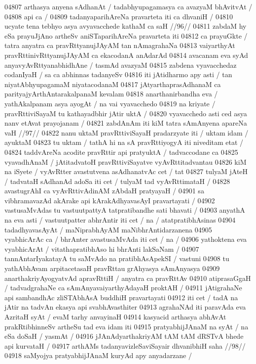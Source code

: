 04807 arthasya anyena sAdhanAt / tadabhyupagamasya ca avazyaM bhAvitvAt /  
04808 api ca /
04809 	tadanyaparihAreNa pravarteta iti ca dhvaniH /
04810 	ucyate tena tebhyo asya avyavacchede kathaM ca saH //96//
04811 zabdaM hy eSa prayuJjAno artheSv aniSTaparihAreNa pravarteta iti 
04812 ca prayuGkte / tatra anyatra ca pravRttyanujJAyAM tan nAmagrahaNa  
04813 vaiyarthyAt pravRttinivRttyanujJAyAM ca ekacodanA anAdarAd 
04814 avacanam eva syAd anyavyAvRttyanabhidhAne / tasmAd avazyaM  
04815 zabdena vyavacchedaz codanIyaH / sa ca abhinnas tadanyeSv
04816 iti jAtidharmo apy asti / tan niyatAbhyupagamaM niyatacodanaM  
04817 jAtyarthaprasAdhanaM ca parityajyArthAntarakalpanaM  kevalam  
04818 anarthanirbandha eva / yathAkalpanam asya ayogAt / na vai vyavacchedo 
04819 na kriyate / pravRttiviSayaM tu kathayadbhir jAtir uktA /  
04820 	vyavacchedo asti ced asya nanv etAvat prayojanam /
04821 	zabdAnAm iti kiM tatra sAmAnyena apareNa vaH //97//  
04822 nanu uktaM pravRttiviSayaH pradarzyate iti / uktam idam / ayuktaM  
04823 tu uktam / tathA hi na sA pravRttiyogyA iti niveditam etat / 
04824 taddvAreNa acodite pravRttir api pratyuktA / tadvaccodane ca 
04825 vyavadhAnaM / jAtitadvatoH pravRttiviSayatve vyAvRttitadvantau
04826 kiM na iSyete / vyAvRtter avastutvena asAdhanatvAc cet / tat  
04827 tulyaM jAteH / tadvataH sAdhanAd adoSa iti cet / tulyaM tad vyAvRttimataH /
04828 avastugrAhI ca vyAvRttivAdinAM zAbdaH pratyayaH /
04901 sa vibhramavazAd akArake api kArakAdhyavasAyI pravartayati /
04902 vastusaMvAdas tu vastuutpattyA tatpratibandhe sati bhavati /
04903 anyathA na eva asti / vastuutpatter abhrAntir iti cet / na / atatpratibhAsinas
04904 tadadhyavasAyAt / maNiprabhAyAM maNibhrAntidarzanena 
04905 vyabhicArAc ca / bhrAnter avastusaMvAda iti cet / na /
04906 yathoktena eva vyabhicArAt / vitathapratibhAso hi bhrAnti lakSaNam /
04907 tannAntarIyakatayA tu saMvAdo na pratibhAsApekSI / vastuni 
04908 tu yathAbhAvam arpitacetasaH pravRttau grAhyasya sAmAnyasya
04909 anarthakriyAyogyatvAd apravRttiH / anyatra ca pravRttAv
04910 atiprasaGgaH / tadvadgrahaNe ca sAmAnyavaiyarthyAdayaH proktAH /  
04911 jAtigrahaNe api sambandhAc zliSTAbhAsA buddhiH pravartayati 
04912 iti cet / tadA na jAtir na tadvAn ekasya api svabhAvasthiter
04913 agrahaNAd iti paravAda eva AzritaH syAt / evaM tarhy anvayinaH 
04914 kasyacid arthasya abhAvAt prakRtibhinneSv artheSu tad eva idam iti  
04915 pratyabhijJAnaM na syAt / na eSa doSaH / yasmAt / 
04916 	jJAnAdyarthakriyAM tAM tAM dRSTvA  bhede api kurvataH /  
04917 	arthAMs tadanyavizleSaviSayair dhvanibhiH saha //98//
04918 	saMyojya pratyabhijJAnaM kuryAd apy anyadarzane /  
